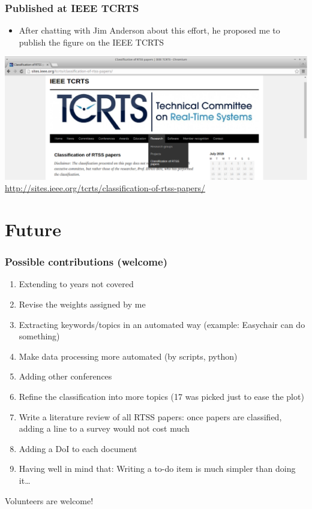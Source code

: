 \documentclass[ignorenonframetext,mathserif]{beamer} %
\begin{document}
\begin{frame}
  \frametitle{Published at IEEE TCRTS}
  \begin{itemize}
  \item After chatting with Jim Anderson about this effort, he
    proposed me to publish the figure on the IEEE TCRTS
  \end{itemize}
  \begin{center}
    \includegraphics[scale=.32]{figs/tcrts_screen}\\
    \url{http://sites.ieee.org/tcrts/classification-of-rtss-papers/}
  \end{center}
\end{frame}

\section{Future}

\begin{frame}
  \frametitle{Possible contributions (welcome)}
  \begin{enumerate}
  \item Extending to years not covered
  \item Revise the weights assigned by me
  \item Extracting keywords/topics in an automated way (example:
    Easychair can do something)
  \item Make data processing more automated (by scripts, python)
  \item Adding other conferences
  \item Refine the classification into more topics (17 was picked just
    to ease the plot)
  \item Write a literature review of all RTSS papers: once papers are
    classified, adding a line to a survey would not cost much
  \item Adding a DoI to each document
  \item Having well in mind that: Writing a to-do item is much simpler
    than doing it\dots
  \end{enumerate}
  \pause
  \begin{center}
    \Large
    Volunteers are welcome!
  \end{center}
\end{frame}
\end{document}
